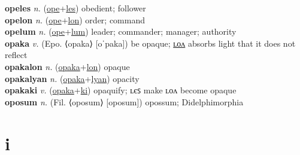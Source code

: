 \textbf{opeles} \textit{n.} (\hyperref[ope]{ope}+\hyperref[les]{les})
obedient; follower \label{opeles} \\
\textbf{opelon} \textit{n.} (\hyperref[ope]{ope}+\hyperref[lon]{lon})
order; command \label{opelon} \\
\textbf{opelum} \textit{n.} (\hyperref[ope]{ope}+\hyperref[lum]{lum})
leader; commander; manager; authority \label{opelum} \\
\textbf{opaka} \textit{v.} (Epo. ⟨opaka⟩ [oˈpaka])
be opaque; \hyperref[opakalon]{ʟᴏᴧ} absorbs light that it does not reflect \label{opaka} \\
\textbf{opakalon} \textit{n.} (\hyperref[opaka]{opaka}+\hyperref[lon]{lon})
opaque \label{opakalon} \\
\textbf{opakalyan} \textit{n.} (\hyperref[opaka]{opaka}+\hyperref[lyan]{lyan})
opacity \label{opakalyan} \\
\textbf{opakaki} \textit{v.} (\hyperref[opaka]{opaka}+\hyperref[ki]{ki})
opaquify; ʟєꜱ make ʟᴏᴧ become opaque \label{opakaki} \\
\textbf{oposum} \textit{n.} (Fil. ⟨oposum⟩ [oposum])
opossum; Didelphimorphia \label{oposum} 

\section{i}

